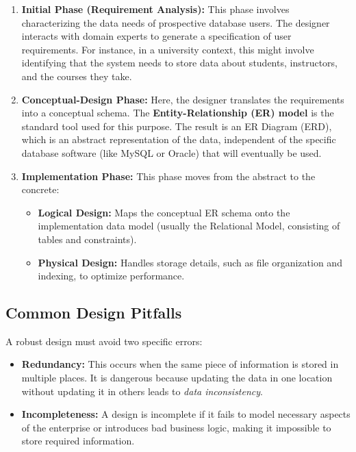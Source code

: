 \documentclass[12pt,a4paper]{article}
\begin{document}
\begin{enumerate}
    \item \textbf{Initial Phase (Requirement Analysis):}
    This phase involves characterizing the data needs of prospective database users. The designer interacts with domain experts to generate a specification of user requirements. For instance, in a university context, this might involve identifying that the system needs to store data about students, instructors, and the courses they take.

    \item \textbf{Conceptual-Design Phase:}
    Here, the designer translates the requirements into a conceptual schema. The \textbf{Entity-Relationship (ER) model} is the standard tool used for this purpose. The result is an ER Diagram (ERD), which is an abstract representation of the data, independent of the specific database software (like MySQL or Oracle) that will eventually be used.

    \item \textbf{Implementation Phase:}
    This phase moves from the abstract to the concrete:
    \begin{itemize}
        \item \textbf{Logical Design:} Maps the conceptual ER schema onto the implementation data model (usually the Relational Model, consisting of tables and constraints).
        \item \textbf{Physical Design:} Handles storage details, such as file organization and indexing, to optimize performance.
    \end{itemize}
\end{enumerate}

\subsection{Common Design Pitfalls}
A robust design must avoid two specific errors:
\begin{itemize}
    \item \textbf{Redundancy:} This occurs when the same piece of information is stored in multiple places. It is dangerous because updating the data in one location without updating it in others leads to \textit{data inconsistency}.
    \item \textbf{Incompleteness:} A design is incomplete if it fails to model necessary aspects of the enterprise or introduces bad business logic, making it impossible to store required information.
\end{itemize}
\end{document}
